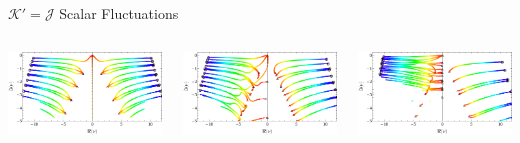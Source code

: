 \documentclass[xcolor=dvipsnames]{beamer}
\begin{document}
\begin{frame}{\(\mathcal K' = \mathcal J\) Scalar Fluctuations}

  \begin{columns}[T]
    \begin{column}{0.33\textwidth}
      \includegraphics[width=1.05\textwidth]{figs/scalar_ef_spherical_a0.pdf}
    \end{column}

    \begin{column}{0.33\textwidth}
      \includegraphics[width=1.05\textwidth]{figs/scalar_ef_spherical_a1_2.pdf}
    \end{column}

    \begin{column}{0.33\textwidth}
      \includegraphics[width=1.05\textwidth]{figs/scalar_ef_spherical_a9_10.pdf}
    \end{column}
  \end{columns}


\end{frame}
\end{document}
